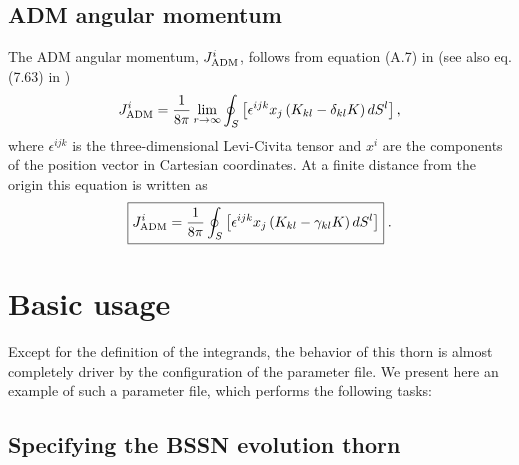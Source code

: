 \subsection{ADM angular momentum}
\label{sec:ADM_angular_momentum_integral}

The ADM angular momentum, $J_{\rm ADM}^{i}$, follows from equation (A.7) in
\cite{alcubierre2008introduction} (see also eq. (7.63) in
\cite{gourgoulhon20073+})
\begin{equation}
J_{\rm ADM}^{i} = \frac{1}{8\pi}\lim_{r\to\infty}\oint_{S}\left[
  \epsilon^{ijk}x_{j}\left(K_{kl} - \delta_{kl}K\right)dS^{l}
  \right],
\end{equation}
where $\epsilon^{ijk}$ is the three-dimensional Levi-Civita tensor and
$x^{i}$ are the components of the position vector in Cartesian coordinates.
At a finite distance from the origin this equation is written as
\begin{equation}
\boxed{
J_{\rm ADM}^{i} = \frac{1}{8\pi}\oint_{S}\left[
  \epsilon^{ijk}x_{j}\left(K_{kl} - \gamma_{kl}K\right)dS^{l}
  \right]
}\; .
\end{equation}


\section{Basic usage}
\label{sec:basic_usage}

Except for the definition of the integrands, the behavior of this thorn
is almost completely driver by the configuration of the parameter file.
We present here an example of such a parameter file, which performs the
following tasks:

\subsection{Specifying the BSSN evolution thorn}
\label{sec:evolution_thorn}

